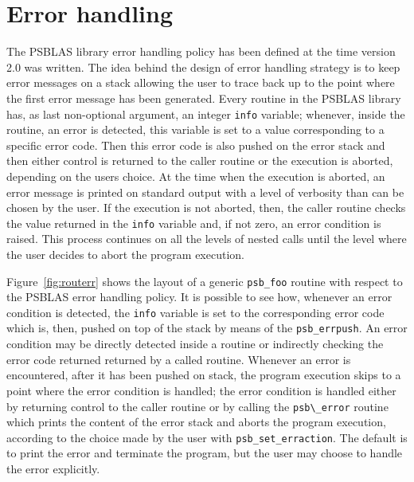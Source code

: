 

\section{Error handling\label{sec:errors}}

The PSBLAS library error handling policy has been defined at the time 
version 2.0 was written. The idea behind the design of  error
handling strategy is to keep error messages on a stack allowing the
user to trace back up to the point where the first error message has
been generated. Every routine in the PSBLAS library has, as last
non-optional argument, an integer \verb|info| variable; whenever,
inside the routine, an error is detected, this variable is set to a
value corresponding to a specific error code. Then this error code is
also pushed on the error stack and then either control is returned to
the caller routine or the execution is aborted, depending on the users
choice. At the time when the execution is aborted, an error message is
printed on standard output with a level of verbosity than can be
chosen by the user. If the execution is not aborted, then, the caller
routine checks the value returned in the \verb|info| variable and, if
not zero, an error condition is raised. This process continues on all the
levels of nested calls until the level where the user decides to abort
the program execution.

Figure~\ref{fig:routerr} shows the layout of a generic \verb|psb_foo|
routine with respect to the PSBLAS error handling policy. It is
possible to see how, whenever an error condition is detected, the
\verb|info| variable is set to the corresponding error code which is,
then, pushed on top of the stack by means of the
\verb|psb_errpush|. An error condition may be directly detected inside
a routine or indirectly checking the error code returned returned by a
called routine. Whenever an error is encountered, after it has been
pushed on stack, the program execution skips to a point where the
error condition is handled; the error condition is handled either by
returning control to the caller routine or by calling the
\verb|psb\_error| routine which prints the content of the error stack
and aborts the program execution, according to the choice made by the
user with \verb|psb_set_erraction|. The default is to print the error
and terminate the program, but the user may choose to handle the error
explicitly. 

